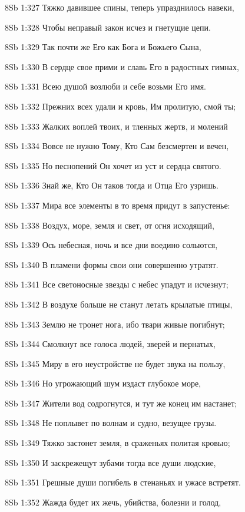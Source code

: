\vs 8Sb 1:327 Тяжко давившее спины, теперь упразднилось навеки, 

\vs 8Sb 1:328 Чтобы неправый закон исчез и гнетущие цепи.

\vs 8Sb 1:329 Так почти же Его как Бога и Божьего Сына, 

\vs 8Sb 1:330 В сердце свое прими и славь Его в радостных гимнах,

\vs 8Sb 1:331 Всею душой возлюби и себе возьми Его имя.

\vs 8Sb 1:332 Прежних всех удали и кровь, Им пролитую, смой ты;

\vs 8Sb 1:333 Жалких воплей твоих, и тленных жертв, и молений

\vs 8Sb 1:334 Вовсе не нужно Тому, Кто Сам безсмертен и вечен, 

\vs 8Sb 1:335 Но песнопений Он хочет из уст и сердца святого.

\vs 8Sb 1:336 Знай же, Кто Он таков  тогда и Отца Его узришь.

\vs 8Sb 1:337 Мира все элементы в то время придут в запустенье: 

\vs 8Sb 1:338 Воздух, море, земля и свет, от огня исходящий, 

\vs 8Sb 1:339 Ось небесная, ночь и все дни воедино сольются,

\vs 8Sb 1:340 В пламени формы свои они совершенно утратят. 

\vs 8Sb 1:341 Все светоносные звезды с небес упадут и исчезнут; 

\vs 8Sb 1:342 В воздухе больше не станут летать крылатые птицы, 

\vs 8Sb 1:343 Землю не тронет нога, ибо твари живые погибнут; 

\vs 8Sb 1:344 Смолкнут все голоса  людей, зверей и пернатых,

\vs 8Sb 1:345 Миру в его неустройстве не будет звука на пользу, 

\vs 8Sb 1:346 Но угрожающий шум издаст глубокое море, 

\vs 8Sb 1:347 Жители вод содрогнутся, и тут же конец им настанет; 

\vs 8Sb 1:348 Не поплывет по волнам и судно, везущее грузы. 

\vs 8Sb 1:349 Тяжко застонет земля, в сраженьях политая кровью;

\vs 8Sb 1:350 И заскрежещут зубами тогда все души людские,

\vs 8Sb 1:351 Грешные души погибель в стенаньях и ужасе встретят. 

\vs 8Sb 1:352 Жажда будет их жечь, убийства, болезни и голод, 

